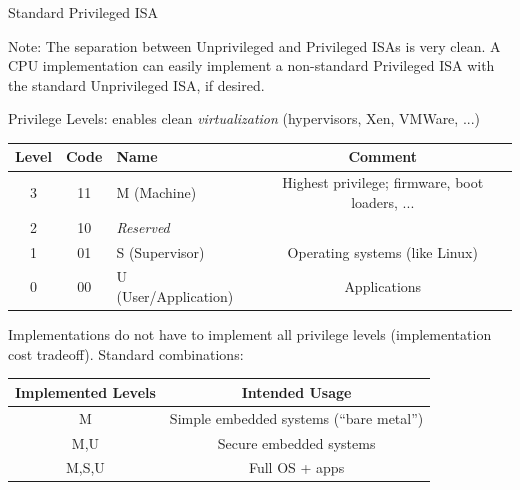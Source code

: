 \documentclass{article}
\newcommand{\hmm}{\hspace*{2em}}
\begin{document}
\begin{center}
  {\Huge
    Standard Privileged ISA}

  \vspace*{0.5in}

  \begin{minipage}{9in}\LARGE
    {\Large Note: The separation between Unprivileged and Privileged ISAs is very
    clean.  A CPU implementation can easily implement a non-standard
    Privileged ISA with the standard Unprivileged ISA, if desired.}

    \vspace{0.5in}

    Privilege Levels: enables clean \emph{virtualization} (hypervisors, Xen, VMWare, ...)

    \begin{center}
      \begin{tabular}{|c|c|l|c|}
        \hline
        Level & Code & Name                 & Comment \\
        \hline
        3     & 11   & M (Machine)          & Highest privilege; firmware, boot loaders, ... \\
        2     & 10   & \hmm \emph{Reserved} & \\
        1     & 01   & S (Supervisor)       & Operating systems (like Linux) \\
        0     & 00   & U (User/Application) & Applications \\
        \hline
      \end{tabular}
    \end{center}

    \vspace{0.5in}

    Implementations do not have to implement all privilege levels
    (implementation cost tradeoff).  Standard combinations:

    \begin{center}
      \begin{tabular}{|c|c|}
        \hline
        Implemented Levels & Intended Usage \\
        \hline
        M                  &   Simple embedded systems (``bare metal'') \\
        M,U                &   Secure embedded systems \\
        M,S,U              &   Full OS + apps \\
        \hline
      \end{tabular}
    \end{center}
  \end{minipage}

\end{center}
\end{document}
